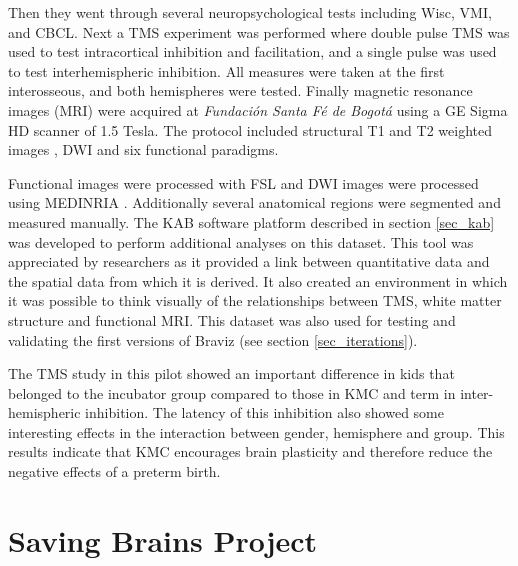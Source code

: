 Then they went through several neuropsychological tests including Wisc, VMI, and CBCL. 
Next a TMS experiment was performed where double pulse TMS was used to test intracortical inhibition and facilitation, and a single pulse was used to test interhemispheric inhibition. All measures were taken at the first interosseous, and both hemispheres were tested.
Finally magnetic resonance images (MRI) were acquired at \emph{Fundación Santa Fé de Bogotá} using a GE Sigma HD scanner of 1.5 Tesla. The protocol included structural T1 and T2 weighted images , DWI and six functional paradigms. 






Functional images were processed with FSL and DWI images were processed using MEDINRIA \autocite{toussaint_medinria:_2007}. Additionally several anatomical regions were segmented and measured manually. The KAB software platform described in section \ref{sec_kab} was developed to perform additional analyses on this dataset. This tool was appreciated by researchers as it provided a link between quantitative data and the spatial data from which it is derived. It also created an environment in which it was possible to think visually of the relationships between TMS, white matter structure and functional MRI. This dataset was also used for testing and validating the first versions of Braviz (see section \ref{sec_iterations}).

The TMS study in this pilot showed an important difference in kids that belonged to the incubator group compared to those in KMC and term \autocite{schneider_cerebral_2012} in inter-hemispheric inhibition. The latency of this inhibition also showed some interesting effects in the interaction between gender, hemisphere and group. This results indicate that KMC encourages brain plasticity and therefore reduce the negative effects of a preterm birth. 


\section{Saving Brains Project}


